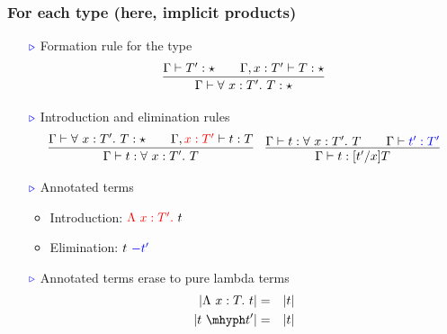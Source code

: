 \documentclass[11pt]{beamer}
\newcommand{\myb}[0]{\ensuremath{\textcolor{blue}{\triangleright}}}
\begin{document}
\begin{frame}
  \frametitle{For each type (here, implicit products)}

  \begin{itemize}
  \item[$\myb$] Formation rule for the type
{\small
    \[
    \infer{\Gamma\vdash \forall\ x : T'.\ T : \star}{\Gamma\vdash T':\star \qquad \Gamma,x:T'\vdash T : \star}
    \]
}

\vspace{-.5cm}

  \item[$\myb$] Introduction and elimination rules
{\small
    \[
    \begin{array}{ll}
      \infer{\Gamma \vdash t : \forall\ x : T'.\ T}{\Gamma \vdash \forall\ x : T' .\ T : \star \qquad \Gamma, {\color{red}x : T'} \vdash t : T} &
    \infer{\Gamma\vdash t : [t'/x]T}{\Gamma \vdash t : \forall\ x : T'.\ T \qquad \Gamma \vdash {\color{blue}t' : T'}}      
    \end{array}
    \]
}
     
\vspace{-.25cm}

  \item[$\myb$] Annotated terms

    \begin{itemize}
    \item Introduction: ${\color{red}\Lambda\ x : T'.}\ t$
    \item Elimination: $t\ {\color{blue}-t'}$
    \end{itemize}

\vspace{.2cm}

  \item[$\myb$] Annotated terms erase to pure lambda terms
    \begin{eqnarray*}
      |\Lambda\ x : T.\ t| & = & |t| \\
      |t\ \mhyph t'| & = & |t|
    \end{eqnarray*}
  \end{itemize}

\vspace{-4.3cm}


\hspace{4cm}  

\vspace{4.5cm}


\end{frame}
\end{document}
